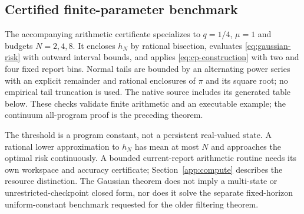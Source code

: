 \subsection*{Certified finite-parameter benchmark}
The accompanying arithmetic certificate specializes to $q=1/4$, $\mu=1$ and budgets $N=2,4,8$. It encloses $h_N$ by rational bisection, evaluates \eqref{eq:gaussian-risk} with outward interval bounds, and applies \eqref{eq:cp-construction} with two and four fixed report bins. Normal tails are bounded by an alternating power series with an explicit remainder and rational enclosures of $\pi$ and its square root; no empirical tail truncation is used. The native source includes its generated table below. These checks validate finite arithmetic and an executable example; the continuum all-program proof is the preceding theorem.


The threshold is a program constant, not a persistent real-valued state. A rational lower approximation to $h_N$ has mean at most $N$ and approaches the optimal risk continuously. A bounded current-report arithmetic routine needs its own workspace and accuracy certificate; Section~\ref{app:compute} describes the resource distinction. The Gaussian theorem does not imply a multi-state or unrestricted-checkpoint closed form, nor does it solve the separate fixed-horizon uniform-constant benchmark requested for the older filtering theorem.
